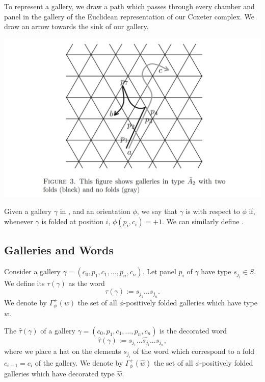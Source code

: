 \documentclass[11pt]{article}
\begin{document}
To represent a gallery, we draw a path which passes through every chamber and panel in the gallery of the Euclidean representation of our Coxeter complex. We draw an arrow towards the sink of our gallery. 

\includegraphics[scale=0.6]{Screenshot 2023-02-03 111653.png}\\

\begin{definition}
    Given a gallery $\gamma$ in \sg, and an orientation $\phi$, we say that $\gamma$ is  with respect to $\phi$ if, whenever $\gamma$ is folded at position $i$, $\phi(p_i,c_i)=+1$.  We can similarly define .
\end{definition}


\subsection{Galleries and Words}

\begin{definition}
    Consider a gallery $\gamma = (c_0,p_1,c_1,...,p_n,c_n)$. Let panel $p_i$ of $\gamma$ have type $s_{j_i}\in S$. We define its  $\tau(\gamma)$ as the word 
    \[\tau(\gamma):=s_{j_1}...s_{j_n}.\]
    We denote by $\Gamma_{\phi}^+(w)$ the set of all $\phi$-positively folded galleries which have type $w$. 
\end{definition}

\begin{definition}
    The  $\hat\tau(\gamma)$ of a gallery $\gamma = (c_0,p_1,c_1,...,p_n,c_n)$ is the decorated word
    \[\hat\tau(\gamma):= s_{j_1}...\hat{s_{j_i}}...s_{j_n},\]
    where we place a hat on the elements $s_{j_i}$ of the word which correspond to a fold $c_{i-1}=c_i$ of the gallery. We denote by $\Gamma_{\phi}^+(\hat{w})$ the set of all $\phi$-positively folded galleries which have decorated type $\hat{w}$.
\end{definition}
\end{document}
